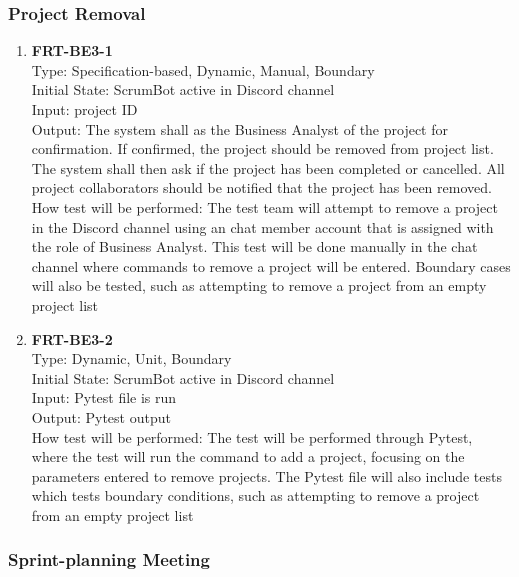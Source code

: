 \documentclass[12pt, titlepage]{article}
\begin{document}
\subsubsection{Project Removal}

\begin{enumerate}
    \item{\textbf{FRT-BE3-1}}\\
    Type: Specification-based, Dynamic, Manual, Boundary\\
    Initial State: ScrumBot active in Discord channel\\
    Input: project ID\\
    Output: The system shall as the Business Analyst of the project for confirmation. If confirmed, the project should be removed from project list. The system shall then ask if the project has been completed or cancelled. All project collaborators should be notified that the project has been removed.\\
    How test will be performed: The test team will attempt to remove a project in the Discord channel using an chat member account that is assigned with the role of Business Analyst. This test will be done manually in the chat channel where commands to remove a project will be entered. Boundary cases will also be tested, such as attempting to remove a project from an empty project list\\
    
    \item{\textbf{FRT-BE3-2}}\\
    Type: Dynamic, Unit, Boundary\\
    Initial State: ScrumBot active in Discord channel\\
    Input: Pytest file is run\\
    Output: Pytest output\\
    How test will be performed: The test will be performed through Pytest, where the test will run the command to add a project, focusing on the parameters entered to remove projects. The Pytest file will also include tests which tests boundary conditions, such as attempting to remove a project from an empty project list\\
\end{enumerate}

\subsubsection{Sprint-planning Meeting}
\end{document}
